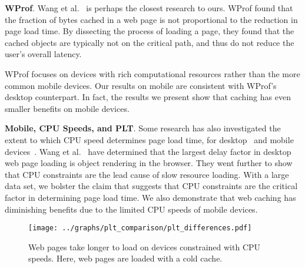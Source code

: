 \textbf{WProf}. Wang et al.~\cite{wang2013demystifying} is perhaps the closest research to ours. WProf found that the fraction of bytes cached in a web page is not proportional to the reduction in page load time. By dissecting the process of loading a page, they found that the cached objects are typically not on the critical path, and thus do not reduce the user's overall latency. 

WProf focuses on devices with rich computational resources rather than the more common mobile devices. Our results on mobile are consistent with WProf's desktop counterpart. In fact, the results we present show that caching has even smaller benefits on mobile devices.

\textbf{Mobile, CPU Speeds, and PLT}.
Some research has also investigated the extent to which CPU speed determines page load time, for desktop~\cite{CPU-plt-1} and mobile devices~\cite{CPU-plt-2, CPU-plt-3}.
Wang et al.~\cite{CPU-plt-2, CPU-plt-3} have determined that the largest delay factor in desktop web page loading is object rendering in the browser. They went further to show that CPU constraints are the lead cause of slow resource loading. 
With a large data set, we bolster the claim that suggests that CPU constraints are the critical factor in determining page load time. We also demonstrate that web caching has diminishing benefits due to the limited CPU speeds of mobile devices.
\begin{figure}[t]
    \texttt{[image: ../graphs/plt\_comparison/plt\_differences.pdf]}
    \caption[]{\label{fig:plt_differences}Web pages take longer to load on devices constrained with CPU speeds. Here, web pages are loaded with a cold cache.}
\end{figure}
